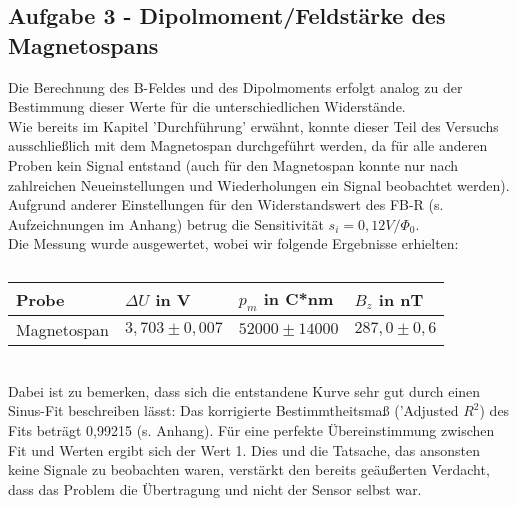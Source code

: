 \subsection{Aufgabe 3 - Dipolmoment/Feldstärke des Magnetospans}
Die Berechnung des B-Feldes und des Dipolmoments erfolgt analog zu der Bestimmung dieser Werte für die unterschiedlichen Widerstände.\\
Wie bereits im Kapitel 'Durchführung' erwähnt, konnte dieser Teil des Versuchs ausschließlich mit dem Magnetospan durchgeführt werden, da für alle anderen Proben kein Signal entstand (auch für den Magnetospan konnte nur nach zahlreichen Neueinstellungen und Wiederholungen ein Signal beobachtet werden). \\
Aufgrund anderer Einstellungen für den Widerstandswert des FB-R (s. Aufzeichnungen im Anhang) betrug die Sensitivität $s_{i}=0,12 V/\Phi_{0}$.\\
Die Messung wurde ausgewertet, wobei wir folgende Ergebnisse erhielten:
\begin{table}[htbp]
\caption{}
\begin{center}
\begin{tabular}{|l|l|l|l|}
\hline
Probe & $\Delta U$ in V & $p_{m}$ in C*nm & $B_{z}$ in nT \\ \hline
Magnetospan & $3,703\pm0,007$ & $52000\pm14000$ & $287,0\pm0,6$ \\ \hline
\end{tabular}
\end{center}
\label{}
\end{table}
~\\
Dabei ist zu bemerken, dass sich die entstandene Kurve sehr gut durch einen Sinus-Fit beschreiben lässt: Das korrigierte Bestimmtheitsmaß ('Adjusted $R^{2}$) des Fits beträgt 0,99215 (s. Anhang). Für eine perfekte Übereinstimmung zwischen Fit und Werten ergibt sich der Wert 1. Dies und die Tatsache, das ansonsten keine Signale zu beobachten waren, verstärkt den bereits geäußerten Verdacht, dass das Problem die Übertragung und nicht der Sensor selbst war.
\clearpage
